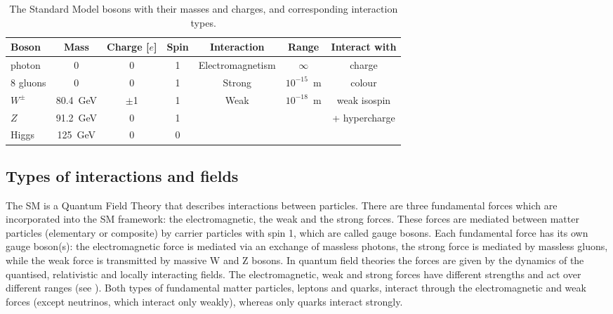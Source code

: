 \begin{table}[h!]
\begin{center}
{
\begin{tabular}{|l|c|c|c|c|c|c|}\cline{1-7}
 Boson & Mass &  Charge [$e$] & Spin  & Interaction & Range & Interact with \\ \hline
    photon  &  0  &  0 & 1 &  Electromagnetism & $ \infty $  &  charge \\ \hline
  8 gluons  &  0  &  0 & 1 &  Strong & $10^{-15}$~m &  colour \\ \hline 
    $W^{\pm}$   &  80.4~GeV  &  $\pm$1 & 1 &  \multirow{2}{*}{Weak}  & \multirow{2}{*}{$10^{-18}$~m} & weak isospin  \\
    $Z$   &  91.2~GeV  &  0 & 1 &  &  & + hypercharge \\ \hline
    Higgs   &  125~GeV  &  0 & 0 &  &  &   \\ 
\hline
\end{tabular}
}
\caption{\label{tab:bosons}The Standard Model bosons with their masses and charges, and corresponding interaction types. }
\end{center}
\end{table}




\subsection{Types of interactions and fields}

The SM is a Quantum Field Theory that describes interactions between particles.
There are three fundamental forces which are incorporated into the SM framework: the electromagnetic, the weak and the strong forces. These forces are mediated between matter particles (elementary or composite) by carrier particles with spin 1, which are called gauge bosons.
Each fundamental force has its own gauge boson(s): the electromagnetic force is mediated via an exchange of massless photons, the strong force is mediated by massless gluons, while the weak force is transmitted by massive W and Z bosons.
In quantum field theories the forces are given by the dynamics of the quantised, relativistic and locally interacting fields.
The electromagnetic, weak and strong forces have different strengths and act over different ranges (see ). 
Both types of fundamental matter particles, leptons and quarks, interact through the electromagnetic and weak forces (except neutrinos, which interact only weakly), whereas only quarks interact strongly.

